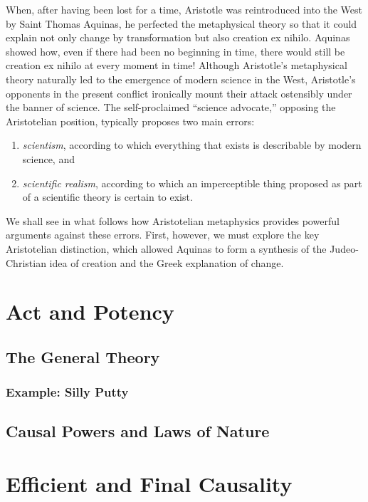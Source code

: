 \documentclass[twocolumn]{article}
\begin{document}
When, after having been lost for a time, Aristotle was reintroduced into the
West by Saint Thomas Aquinas, he perfected the metaphysical theory so that it
could explain not only change by transformation but also creation ex nihilo.
Aquinas showed how, even if there had been no beginning in time, there would
still be creation ex nihilo at every moment in time!  Although Aristotle's
metaphysical theory naturally led to the emergence of modern science in the
West, Aristotle's opponents in the present conflict ironically mount their
attack ostensibly under the banner of science.  The self-proclaimed ``science
advocate,'' opposing the Aristotelian position, typically proposes two main
errors:
\begin{enumerate}
   \item \emph{scientism}, according to which everything that exists is
      describable by modern science, and
   \item \emph{scientific realism}, according to which an imperceptible thing
      proposed as part of a scientific theory is certain to exist.
\end{enumerate}
We shall see in what follows how Aristotelian metaphysics provides powerful
arguments against these errors.  First, however, we must explore the key
Aristotelian distinction, which allowed Aquinas to form a synthesis of the
Judeo-Christian idea of creation and the Greek explanation of change.

\section{Act and Potency}

\subsection{The General Theory}

\subsubsection{Example: Silly Putty}

\subsection{Causal Powers and Laws of Nature}

\section{Efficient and Final Causality}
\end{document}
